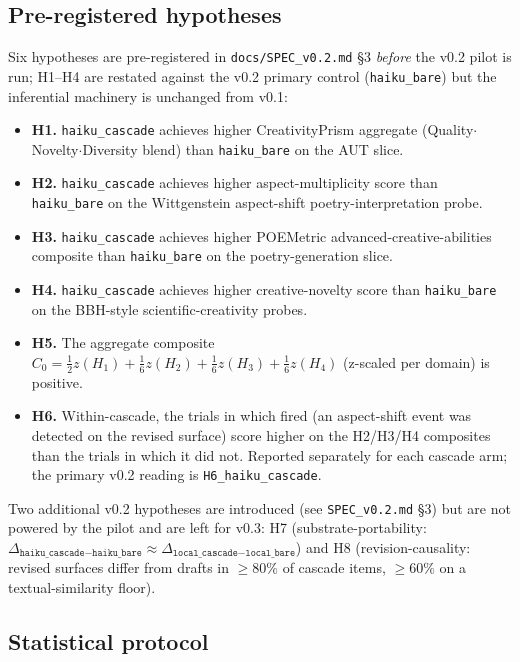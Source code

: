 \subsection{Pre-registered hypotheses}

Six hypotheses are pre-registered in \texttt{docs/SPEC\_v0.2.md} \S3 \emph{before} the v0.2 pilot is run; H1--H4 are restated against the v0.2 primary control (\texttt{haiku\_bare}) but the inferential machinery is unchanged from v0.1:

\begin{itemize}[leftmargin=1.4em]
\item \textbf{H1.} \texttt{haiku\_cascade} achieves higher CreativityPrism aggregate (Quality$\cdot$Novelty$\cdot$Diversity blend) than \texttt{haiku\_bare} on the AUT slice.
\item \textbf{H2.} \texttt{haiku\_cascade} achieves higher aspect-multiplicity score than \texttt{haiku\_bare} on the Wittgenstein aspect-shift poetry-interpretation probe.
\item \textbf{H3.} \texttt{haiku\_cascade} achieves higher POEMetric advanced-creative-abilities composite than \texttt{haiku\_bare} on the poetry-generation slice.
\item \textbf{H4.} \texttt{haiku\_cascade} achieves higher creative-novelty score than \texttt{haiku\_bare} on the BBH-style scientific-creativity probes.
\item \textbf{H5.} The aggregate composite $C_0 = \tfrac{1}{2} z(H_1) + \tfrac{1}{6} z(H_2) + \tfrac{1}{6} z(H_3) + \tfrac{1}{6} z(H_4)$ (z-scaled per domain) is positive.
\item \textbf{H6.} Within-cascade, the trials in which  fired (an aspect-shift event was detected on the revised surface) score higher on the H2/H3/H4 composites than the trials in which it did not. Reported separately for each cascade arm; the primary v0.2 reading is \texttt{H6\_haiku\_cascade}.
\end{itemize}
Two additional v0.2 hypotheses are introduced (see \texttt{SPEC\_v0.2.md} \S3) but are not powered by the pilot and are left for v0.3: H7 (substrate-portability: $\Delta_{\texttt{haiku\_cascade}-\texttt{haiku\_bare}} \approx \Delta_{\texttt{local\_cascade}-\texttt{local\_bare}}$) and H8 (revision-causality: revised surfaces differ from drafts in $\geq 80\%$ of cascade items, $\geq 60\%$ on a textual-similarity floor).

\subsection{Statistical protocol}

